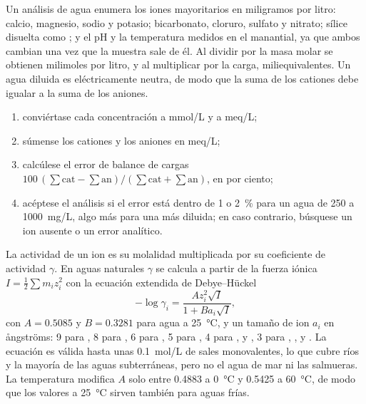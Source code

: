 Un análisis de agua enumera los iones mayoritarios en miligramos por litro: calcio,
magnesio, sodio y potasio; bicarbonato, cloruro, sulfato y nitrato;
sílice disuelta como ; y el pH y la temperatura medidos en el
manantial, ya que ambos cambian una vez que la muestra sale de él. Al dividir
por la masa molar se obtienen milimoles por litro, y al multiplicar por la carga,
miliequivalentes. Un agua diluida es eléctricamente neutra, de modo que la suma de
los cationes debe igualar a la suma de los aniones.

\begin{method}\label{met:b3:water-rock-interaction:analysis}
\begin{enumerate}
\item conviértase cada concentración a \unit{mmol/L} y a \unit{meq/L};
\item súmense los cationes y los aniones en \unit{meq/L};
\item calcúlese el error de balance de cargas $100\,(\sum\text{cat} -
  \sum\text{an})/(\sum\text{cat} + \sum\text{an})$, en por ciento;
\item acéptese el análisis si el error está dentro de 1 o \qty{2}{\percent} para
  un agua de 250 a \qty{1000}{mg/L}, algo más para una más diluida;
  en caso contrario, búsquese un ion ausente o un error analítico.
\end{enumerate}
\end{method}

La actividad de un ion es su molalidad multiplicada por su coeficiente de
actividad $\gamma$. En aguas naturales $\gamma$ se calcula a partir de la fuerza iónica $I =
\tfrac12\sum m_i z_i^2$ con la ecuación extendida de Debye--Hückel
\[
-\log\gamma_i = \frac{A z_i^2\sqrt I}{1 + B a_i\sqrt I},
\]
con $A = 0.5085$ y $B = 0.3281$ para agua a \qty{25}{\celsius}, y un tamaño de
ion $a_i$ en ångströms: 9 para , 8 para , 6 para
, 5 para , 4 para ,  y ,
3 para , ,  y . La ecuación es válida hasta
unas \qty{0.1}{mol/L} de sales monovalentes, lo que cubre ríos y la mayoría de
las aguas subterráneas, pero no el agua de mar ni las salmueras. La temperatura
modifica $A$ solo entre 0.4883 a \qty{0}{\celsius} y 0.5425 a \qty{60}{\celsius},
de modo que los valores a \qty{25}{\celsius} sirven también para aguas frías.

